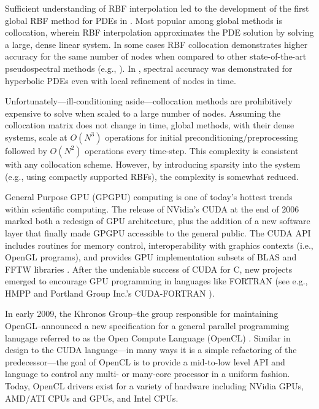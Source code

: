\documentclass[11pt]{report}
\begin{document}
Sufficient understanding of RBF interpolation led to the development of the first global RBF method for PDEs in \cite{Kansa1990a}. Most popular among global methods is collocation, wherein RBF interpolation approximates the PDE solution by solving a large, dense linear system. 
In some cases RBF collocation demonstrates higher accuracy for the same number of nodes when compared to other state-of-the-art pseudospectral methods (e.g., \cite{Larsson2003} \cite{Flyer2007} \cite{Flyer2009b}). In \cite{Flyer2010}, spectral accuracy was demonstrated for hyperbolic PDEs even with local refinement of nodes in time.


Unfortunately---ill-conditioning aside---collocation methods are prohibitively expensive to solve when scaled to a large number of nodes. Assuming the collocation matrix does not change in time, global methods, with their dense systems, scale at $O(N^3)$ operations for initial preconditioning/preprocessing followed by $O(N^2)$ operations every time-step. This complexity is consistent with any collocation scheme. However, by introducing sparsity into the system (e.g., using compactly supported RBFs), the complexity is somewhat reduced.



General Purpose GPU (GPGPU) computing is one of today's hottest trends within scientific computing. 
The release of NVidia's CUDA at the end of 2006 marked both a 
redesign of GPU architecture, plus the addition of a new software layer that finally made GPGPU accessible to the general public. The CUDA API includes routines for memory control, interoperability with graphics contexts (i.e., 
OpenGL programs), and provides GPU implementation subsets of BLAS and FFTW libraries \cite{CudaGuide2011}. After the undeniable success of CUDA for C, new projects emerged to encourage GPU programming in languages like FORTRAN (see e.g., HMPP \cite{HMPP2009} and Portland Group Inc.'s CUDA-FORTRAN \cite{CudaFortran2009}). 

In early 2009, the Khronos Group--the group responsible for maintaining OpenGL--announced a new specification for a general 
parallel programming lanugage referred to as the Open Compute Language (OpenCL) \cite{OpenCL2009}. Similar in design to the CUDA language---in many ways it is a simple refactoring of the predecessor---the goal of OpenCL is to provide a mid-to-low level API and language to control any multi- or many-core processor in a uniform fashion. Today, OpenCL drivers exist for a variety of hardware including NVidia GPUs, AMD/ATI CPUs and GPUs, and Intel CPUs. 
\end{document}
